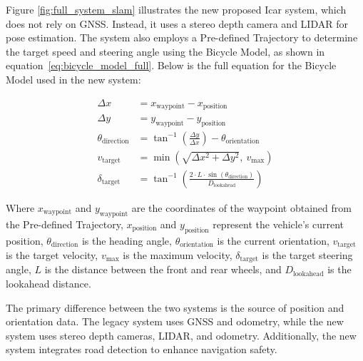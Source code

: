 Figure \ref{fig:full_system_slam} illustrates the new proposed Icar system, which does not rely on GNSS. Instead, it uses a stereo depth camera and LIDAR for pose estimation. The system also employs a Pre-defined Trajectory to determine the target speed and steering angle using the Bicycle Model, as shown in equation~\ref{eq:bicycle_model_full}. Below is the full equation for the Bicycle Model used in the new system:

\begin{equation}
	\begin{aligned}
		\Delta x &= x_{\text{waypoint}} - x_{\text{position}} \\
		\Delta y &= y_{\text{waypoint}} - y_{\text{position}} \\
		\theta_{\text{direction}} &= \tan^{-1}\left(\frac{\Delta y}{\Delta x}\right) - \theta_{\text{orientation}} \\
		v_{\text{target}} &= \min\left(\sqrt{\Delta x^2 + \Delta y^2}, \ v_{\text{max}}\right) \\
		\delta_{\text{target}} &= \tan^{-1}\left( \frac{2 \cdot L \cdot \sin(\theta_{\text{direction}})}{D_{\text{lookahead}}} \right)
		\label{eq:bicycle_model_full}
	\end{aligned}		
\end{equation}

Where $x_{\text{waypoint}}$ and $y_{\text{waypoint}}$ are the coordinates of the waypoint obtained from the Pre-defined Trajectory, $x_{\text{position}}$ and $y_{\text{position}}$ represent the vehicle's current position, $\theta_{\text{direction}}$ is the heading angle, $\theta_{\text{orientation}}$ is the current orientation, $v_{\text{target}}$ is the target velocity, $v_{\text{max}}$ is the maximum velocity, $\delta_{\text{target}}$ is the target steering angle, $L$ is the distance between the front and rear wheels, and $D_{\text{lookahead}}$ is the lookahead distance.

The primary difference between the two systems is the source of position and orientation data. The legacy system uses GNSS and odometry, while the new system uses stereo depth cameras, LIDAR, and odometry. Additionally, the new system integrates road detection to enhance navigation safety.

